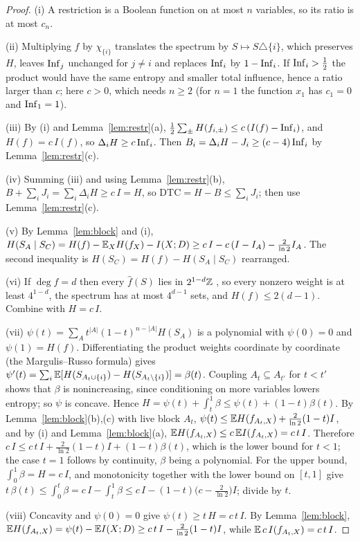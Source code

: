 \begin{proof}
(i) A restriction is a Boolean function on at most $n$ variables, so its ratio is at most $c_n$.

(ii) Multiplying $f$ by $\chi_{\{i\}}$ translates the spectrum by $S\mapsto S\triangle\{i\}$, which preserves $H$, leaves $\operatorname{Inf}_j$ unchanged for $j\ne i$ and replaces $\operatorname{Inf}_i$ by $1-\operatorname{Inf}_i$. If $\operatorname{Inf}_i>\frac12$ the product would have the same entropy and smaller total influence, hence a ratio larger than $c$; here $c>0$, which needs $n\ge2$ (for $n=1$ the function $x_1$ has $c_1=0$ and $\operatorname{Inf}_1=1$).

(iii) By (i) and Lemma~\ref{lem:restr}(a), $\frac12\sum_\pm H(f_{i,\pm})\le c\,(I(f)-\operatorname{Inf}_i)$, and $H(f)=c\,I(f)$, so $\Delta_iH\ge c\operatorname{Inf}_i$. Then $B_i=\Delta_iH-J_i\ge(c-4)\operatorname{Inf}_i$ by Lemma~\ref{lem:restr}(c).

(iv) Summing (iii) and using Lemma~\ref{lem:restr}(b), $B+\sum_iJ_i=\sum_i\Delta_iH\ge c\,I=H$, so $\mathrm{DTC}=H-B\le\sum_iJ_i$; then use Lemma~\ref{lem:restr}(c).

(v) By Lemma~\ref{lem:block} and (i), $H(S_A\mid S_C)=H(f)-\mathbb{E}_XH(f_X)-I(X;D)\ge c\,I-c\,(I-I_A)-\frac{2}{\ln2}I_A$. The second inequality is $H(S_C)=H(f)-H(S_A\mid S_C)$ rearranged.

(vi) If $\deg f=d$ then every $\hat f(S)$ lies in $2^{1-d}\mathbb{Z}$ \cite[Exercise~1.11]{ODonnell2014}, so every nonzero weight is at least $4^{1-d}$, the spectrum has at most $4^{d-1}$ sets, and $H(f)\le2(d-1)$. Combine with $H=c\,I$.

(vii) $\psi(t)=\sum_At^{|A|}(1-t)^{n-|A|}H(S_A)$ is a polynomial with $\psi(0)=0$ and $\psi(1)=H(f)$. Differentiating the product weights coordinate by coordinate (the Margulis--Russo formula) gives $\psi'(t)=\sum_i\mathbb{E}[H(S_{A_t\cup\{i\}})-H(S_{A_t\setminus\{i\}})]=\beta(t)$. Coupling $A_t\subseteq A_{t'}$ for $t<t'$ shows that $\beta$ is nonincreasing, since conditioning on more variables lowers entropy; so $\psi$ is concave. Hence $H=\psi(t)+\int_t^1\beta\le\psi(t)+(1-t)\beta(t)$. By Lemma~\ref{lem:block}(b),(c) with live block $A_t$, $\psi(t)\le\mathbb{E} H(f_{A_t,X})+\frac2{\ln2}(1-t)I$, and by (i) and Lemma~\ref{lem:block}(a), $\mathbb{E} H(f_{A_t,X})\le c\,\mathbb{E} I(f_{A_t,X})=c\,t\,I$. Therefore $c\,I\le c\,t\,I+\frac2{\ln2}(1-t)I+(1-t)\beta(t)$, which is the lower bound for $t<1$; the case $t=1$ follows by continuity, $\beta$ being a polynomial. For the upper bound, $\int_0^1\beta=H=c\,I$, and monotonicity together with the lower bound on $[t,1]$ give $t\,\beta(t)\le\int_0^t\beta=c\,I-\int_t^1\beta\le c\,I-(1-t)\bigl(c-\frac2{\ln2}\bigr)I$; divide by $t$.

(viii) Concavity and $\psi(0)=0$ give $\psi(t)\ge t\,H=c\,t\,I$. By Lemma~\ref{lem:block}, $\mathbb{E} H(f_{A_t,X})=\psi(t)-\mathbb{E} I(X;D)\ge c\,t\,I-\frac2{\ln2}(1-t)I$, while $\mathbb{E}\,c\,I(f_{A_t,X})=c\,t\,I$.
\end{proof}

